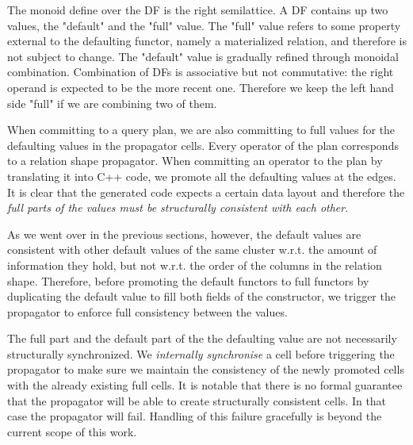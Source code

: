 \begin{code}

  \caption{\label{lst:defaulting_semigroup}The monoid define over the DF 
  is the right semilattice. A DF contains up  two values, the "default" and the "full" value.
  The "full" value refers to some property external to the defaulting functor, namely a 
  materialized relation, and therefore is not subject to change. The "default" value
  is gradually refined through monoidal combination. Combination of DFs is associative but not
  commutative: the right operand is expected to be the more recent one. Therefore
  we keep the left hand side "full" if we are combining two of them.}
\end{code}

When committing to a query plan, we are also committing to full values
for the defaulting values in the propagator cells. Every operator of
the plan corresponds to a relation shape propagator. When committing
an operator to the plan by translating it into C++ code, we promote
all the defaulting values at the edges. It is clear that the generated
code expects a certain data layout and therefore the \emph{full parts
of the values must be structurally consistent with each other}.

As we went over in the previous sections, however, the default values
are consistent with other default values of the same cluster
w.r.t. the amount of information they hold, but not w.r.t. the order
of the columns in the relation shape. Therefore, before promoting the
default functors to full functors by duplicating the default value to
fill both fields of the  constructor, we trigger
the propagator to enforce full consistency between the
 values.

The full part and the default part of the the defaulting value are not
necessarily structurally synchronized. We \emph{internally
synchronise} a cell before triggering the propagator to make sure we
maintain the consistency of the newly promoted cells with the already
existing full cells. It is notable that there is no formal guarantee that the propagator
will be able to create structurally consistent cells. In that case the
propagator will fail. Handling of this failure gracefully is beyond
the current scope of this work.

